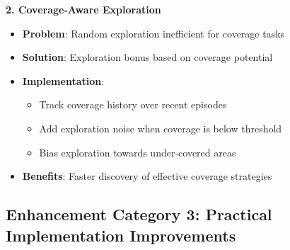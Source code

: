 \documentclass[12pt,a4paper]{report}
\begin{document}
\textbf{2. Coverage-Aware Exploration}
\begin{itemize}
\item \textbf{Problem}: Random exploration inefficient for coverage tasks
\item \textbf{Solution}: Exploration bonus based on coverage potential
\item \textbf{Implementation}: 
\begin{itemize}
\item Track coverage history over recent episodes
\item Add exploration noise when coverage is below threshold
\item Bias exploration towards under-covered areas
\end{itemize}
\item \textbf{Benefits}: Faster discovery of effective coverage strategies
\end{itemize}

\subsection{Enhancement Category 3: Practical Implementation Improvements}
\end{document}

